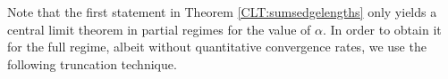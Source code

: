 \documentclass{article}
\theoremstyle{definition}
\numberwithin{equation}{section}
\theoremstyle{remark}
\newtheorem{remark}[theorem]{Remark}
\newcommand{\E}{\mathbb{E}}
\newcommand{\Var}{\mathrm{Var}}
\begin{document}

Note that the first statement in Theorem \ref{CLT:sumsedgelengths} only yields a central limit theorem in partial regimes for the value of $\alpha$. In order to obtain it for the full regime, albeit without quantitative convergence rates, we use the following truncation technique.
\end{document}
